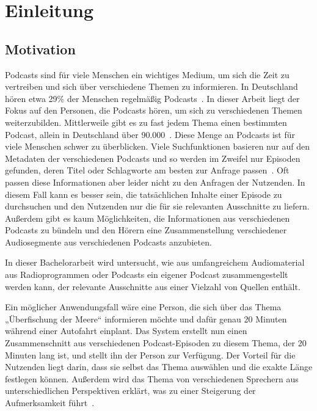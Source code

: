 \chapter{Einleitung}\label{ch:intro}

\section{Motivation}

Podcasts sind für viele Menschen ein wichtiges Medium, um sich die Zeit zu vertreiben und sich über verschiedene Themen zu informieren. 
In Deutschland hören etwa 29\% der Menschen regelmäßig Podcasts~\cite{newman2022}.
In dieser Arbeit liegt der Fokus auf den Personen, die Podcasts hören, um sich zu verschiedenen Themen weiterzubilden.
Mittlerweile gibt es zu fast jedem Thema einen bestimmten Podcast, allein in Deutschland über 90.000~\cite{listennotes}.
Diese Menge an Podcasts ist für viele Menschen schwer zu überblicken.
Viele Suchfunktionen basieren nur auf den Metadaten der verschiedenen Podcasts und so werden im Zweifel nur Episoden gefunden, deren Titel oder Schlagworte am besten zur Anfrage passen~\cite{maroni2020}.
Oft passen diese Informationen aber leider nicht zu den Anfragen der Nutzenden.
In diesem Fall kann es besser sein, die tatsächlichen Inhalte einer Episode zu durchsuchen und den Nutzenden nur die für sie relevanten Ausschnitte zu liefern.
Außerdem gibt es kaum Möglichkeiten, die Informationen aus verschiedenen Podcasts zu bündeln und den Hörern eine Zusammenstellung verschiedener Audiosegmente aus verschiedenen Podcasts anzubieten.

In dieser Bachelorarbeit wird untersucht, wie aus umfangreichem Audiomaterial aus Radioprogrammen oder Podcasts ein eigener Podcast zusammengestellt werden kann, der relevante Ausschnitte aus einer Vielzahl von Quellen enthält.

Ein möglicher Anwendungsfall wäre eine Person, die sich über das Thema „Überfischung der Meere“ informieren möchte und dafür genau 20 Minuten während einer Autofahrt einplant. 
Das System erstellt nun einen Zusammenschnitt aus verschiedenen Podcast-Episoden zu diesem Thema, der 20 Minuten lang ist, und stellt ihn der Person zur Verfügung. 
Der Vorteil für die Nutzenden liegt darin, dass sie selbst das Thema auswählen und die exakte Länge festlegen können.
Außerdem wird das Thema von verschiedenen Sprechern aus unterschiedlichen Perspektiven erklärt, was zu einer Steigerung der Aufmerksamkeit führt~\cite{kang2012}.

